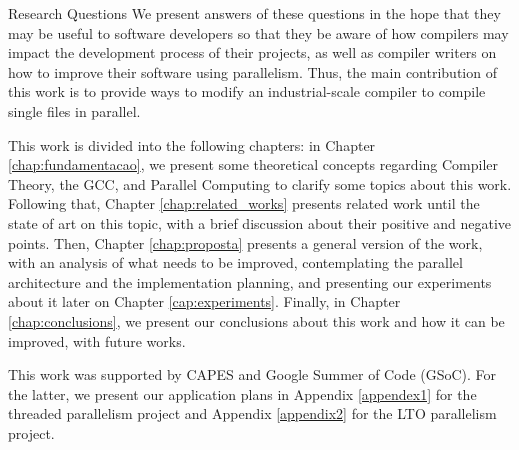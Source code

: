 \begin{section}{Research Questions}
We present answers of these questions in the hope that they may be useful to software
developers so that they be aware of how compilers may impact the development
process of their projects, as well as compiler writers on how to improve
their software using parallelism. Thus, the main contribution of this work is
to provide ways to modify an industrial-scale compiler to
compile single files in parallel.

This work is divided into the following chapters: in Chapter
\ref{chap:fundamentacao}, we present some theoretical concepts regarding
Compiler Theory, the GCC,  and Parallel Computing to clarify some topics about this work.
Following that, Chapter \ref{chap:related_works} presents related work until
the state of art on this topic, with a brief discussion about their positive
and negative points. Then, Chapter \ref{chap:proposta} presents a general
version of the work, with an analysis of what needs to be improved,
contemplating the parallel architecture and the implementation planning, and presenting
our experiments about it later on Chapter \ref{cap:experiments}. Finally,
in Chapter \ref{chap:conclusions}, we present our conclusions about this work
and how it can be improved, with future works.

This work was supported by CAPES and Google Summer of Code (GSoC). For the
latter, we present our application plans in Appendix \ref{appendex1} for the threaded
parallelism project and Appendix \ref{appendix2} for the LTO parallelism project.  


\end{section}
